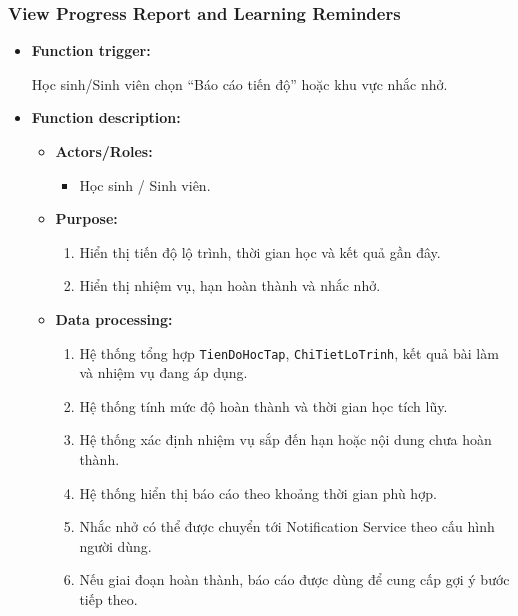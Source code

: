 \documentclass[12pt,a4paper,oneside]{report}
\begin{document}
\subsubsection{View Progress Report and Learning Reminders}
\label{subsubsec:view-progress-report-reminders}

\begin{itemize}

    \item \textbf{Function trigger:}

    Học sinh/Sinh viên chọn ``Báo cáo tiến độ'' hoặc khu vực nhắc nhở.

    \item \textbf{Function description:}

    \begin{itemize}

        \item \textbf{Actors/Roles:}
        \begin{itemize}
            \item Học sinh / Sinh viên.
        \end{itemize}

        \item \textbf{Purpose:}
        \begin{enumerate}
            \item Hiển thị tiến độ lộ trình, thời gian học và kết quả gần đây.
            \item Hiển thị nhiệm vụ, hạn hoàn thành và nhắc nhở.
        \end{enumerate}

        \item \textbf{Data processing:}
        \begin{enumerate}
            \item Hệ thống tổng hợp \texttt{TienDoHocTap}, \texttt{ChiTietLoTrinh}, kết quả bài làm và nhiệm vụ đang áp dụng.
            \item Hệ thống tính mức độ hoàn thành và thời gian học tích lũy.
            \item Hệ thống xác định nhiệm vụ sắp đến hạn hoặc nội dung chưa hoàn thành.
            \item Hệ thống hiển thị báo cáo theo khoảng thời gian phù hợp.
            \item Nhắc nhở có thể được chuyển tới Notification Service theo cấu hình người dùng.
            \item Nếu giai đoạn hoàn thành, báo cáo được dùng để cung cấp gợi ý bước tiếp theo.
        \end{enumerate}


\end{itemize}
\end{itemize}
\end{document}
